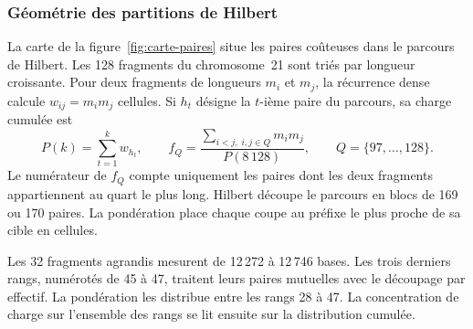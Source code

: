 \subsubsection{Géométrie des partitions de Hilbert}\label{sec:carte-paires}

La carte de la figure~\ref{fig:carte-paires} situe les paires coûteuses dans le parcours de Hilbert. Les 128 fragments du chromosome~21 sont triés par longueur croissante. Pour deux fragments de longueurs \(m_i\) et \(m_j\), la récurrence dense calcule \(w_{ij}=m_i m_j\) cellules. Si \(h_t\) désigne la \(t\)-ième paire du parcours, sa charge cumulée est
\[
  P(k)=\sum_{t=1}^{k} w_{h_t},\qquad
  f_Q=\frac{\sum_{i<j,\;i,j\in Q} m_i m_j}{P(8\,128)},
  \qquad Q=\{97,\ldots,128\}.
\]
Le numérateur de \(f_Q\) compte uniquement les paires dont les deux fragments appartiennent au quart le plus long. Hilbert découpe le parcours en blocs de 169 ou 170 paires. La pondération place chaque coupe au préfixe le plus proche de sa cible en cellules.


\FloatBarrier
{}
Les 32 fragments agrandis mesurent de 12\,272 à 12\,746 bases. Les trois derniers rangs, numérotés de 45 à 47, traitent leurs paires mutuelles avec le découpage par effectif. La pondération les distribue entre les rangs 28 à 47. La concentration de charge sur l’ensemble des rangs se lit ensuite sur la distribution cumulée.

